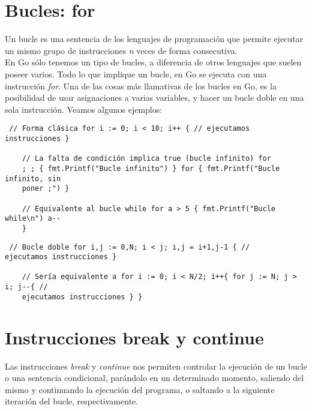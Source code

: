 \section{Bucles: for}

Un bucle es una sentencia de los lenguajes de programación que permite ejecutar
un mismo grupo de instrucciones \textit{n} veces de forma consecutiva.\\

En Go sólo tenemos un tipo de bucles, a diferencia de otros lenguajes que suelen
poseer varios. Todo lo que implique un bucle, en Go se ejecuta con una
instrucción \textit{for}. Una de las cosas más llamativas de los bucles en Go,
es la posibilidad de usar asignaciones a varias variables, y hacer un bucle
doble en una sola instrucción. Veamos algunos ejemplos:

\begin{verbatim} // Forma clásica for i := 0; i < 10; i++ { // ejecutamos
instrucciones }
    
	// La falta de condición implica true (bucle infinito) for
	; ; { fmt.Printf("Bucle infinito") } for { fmt.Printf("Bucle infinito, sin
	poner ;") }
    
	// Equivalente al bucle while for a > 5 { fmt.Printf("Bucle while\n") a--
	} \end{verbatim}

\begin{verbatim} // Bucle doble for i,j := 0,N; i < j; i,j = i+1,j-1 { //
ejecutamos instrucciones }
    
	// Sería equivalente a for i := 0; i < N/2; i++{ for j := N; j > i; j--{ //
	ejecutamos instrucciones } } \end{verbatim}

\section{Instrucciones break y continue}

Las instrucciones \textit{break} y \textit{continue} nos permiten controlar la
ejecución de un bucle o una sentencia condicional, parándolo en un determinado
momento, saliendo del mismo y continuando la ejecución del programa, o saltando
a la siguiente iteración del bucle, respectivamente.\\

